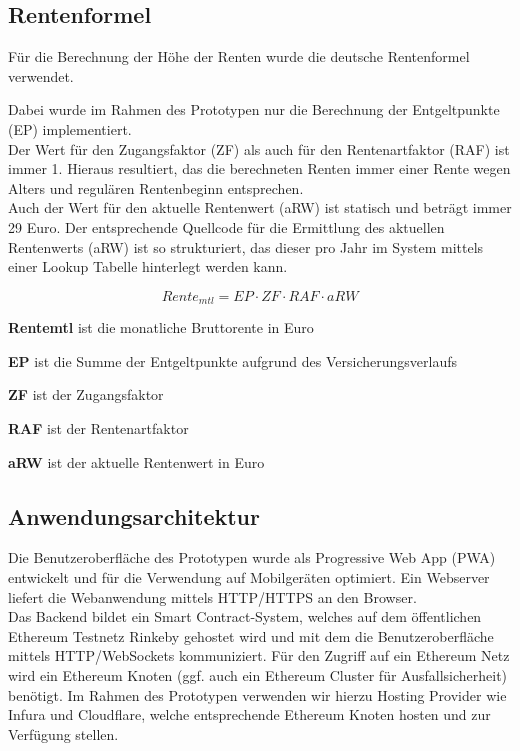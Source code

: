 \subsection{Rentenformel}
Für die Berechnung der Höhe der Renten wurde die deutsche Rentenformel verwendet.

Dabei wurde im Rahmen des Prototypen nur die Berechnung der Entgeltpunkte (EP) implementiert. 
\\
Der Wert für den Zugangsfaktor (ZF) als auch für den Rentenartfaktor (RAF) ist immer 1. Hieraus resultiert, das die berechneten Renten immer einer Rente wegen Alters und regulären Rentenbeginn entsprechen.
\\
Auch der Wert für den aktuelle Rentenwert (aRW) ist statisch und beträgt immer 29 Euro. Der entsprechende Quellcode für die Ermittlung des aktuellen Rentenwerts (aRW) ist so strukturiert, das dieser pro Jahr im System mittels einer Lookup Tabelle hinterlegt werden kann.

\begin{equation*}
Rente_{mtl} = EP \cdot ZF \cdot RAF \cdot aRW
\end{equation*}

\begin{compactitem}
\item \textbf{Rentemtl} ist die monatliche Bruttorente in Euro
\item \textbf{EP} ist die Summe der Entgeltpunkte aufgrund des Versicherungsverlaufs
\item \textbf{ZF} ist der Zugangsfaktor
\item \textbf{RAF} ist der Rentenartfaktor
\item \textbf{aRW} ist der aktuelle Rentenwert in Euro
\end{compactitem}


\subsection{Anwendungsarchitektur}
Die Benutzeroberfläche des Prototypen wurde als Progressive Web App (PWA) entwickelt und für die Verwendung auf Mobilgeräten optimiert. Ein Webserver liefert die Webanwendung mittels HTTP/HTTPS an den Browser.
\\
Das Backend bildet ein Smart Contract-System, welches auf dem öffentlichen Ethereum Testnetz Rinkeby gehostet wird und mit dem die Benutzeroberfläche mittels HTTP/WebSockets kommuniziert. Für den Zugriff auf ein Ethereum Netz wird ein Ethereum Knoten (ggf. auch ein Ethereum Cluster für Ausfallsicherheit) benötigt. Im Rahmen des Prototypen verwenden wir hierzu Hosting Provider wie Infura und Cloudflare, welche entsprechende Ethereum Knoten hosten und zur Verfügung stellen.

